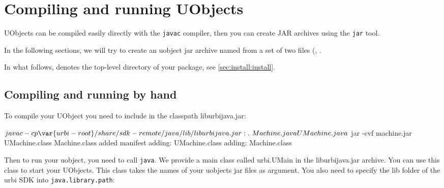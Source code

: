 \section{Compiling and running UObjects}

UObjects can be compiled easily directly with the \lstinline{javac}
compiler, then you can create JAR archives using the \lstinline{jar} tool.

In the following sections, we will try to create an uobject jar archive
named  from a set of two files (,
.

In what follows,  denotes the top-level directory of your
\usdk package, see \autoref{sec:install:install}.

\subsection{Compiling and running by hand}

To compile your UObject you need to include in the classpath
liburbijava.jar:

\begin{shell}
$ javac -cp \var{urbi-root}/share/sdk-remote/java/lib/liburbijava.jar:. \
  Machine.java UMachine.java
$ jar -cvf machine.jar UMachine.class Machine.class
added manifest
adding: UMachine.class
adding: Machine.class
\end{shell}

Then to run your uobject, you need to call \lstinline{java}. We provide a
main class called urbi.UMain in the liburbijava.jar archive. You can use
this class to start your UObjects. This class takes the names of your
uobjects jar files as argument.  You also need to specify the lib folder of
the urbi SDK into \lstinline{java.library.path}:



